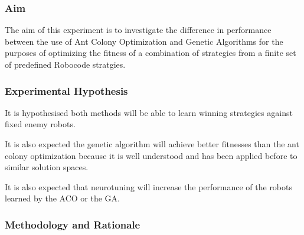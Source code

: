 \subsubsection{Aim}
The aim of this experiment is to investigate the difference in performance between the use of Ant Colony Optimization and Genetic Algorithms for the purposes of optimizing the fitness of a combination of strategies from a finite set of predefined Robocode stratgies.

\subsubsection{Experimental Hypothesis}
It is hypothesised both methods will be able to  learn winning strategies against fixed enemy robots.

It is also expected the genetic algorithm will achieve better fitnesses than the ant colony optimization because it is well understood and has been applied before to similar solution spaces.

It is also expected that neurotuning will increase the performance of the robots learned by the ACO or the GA.

\subsubsection{Methodology and Rationale}

